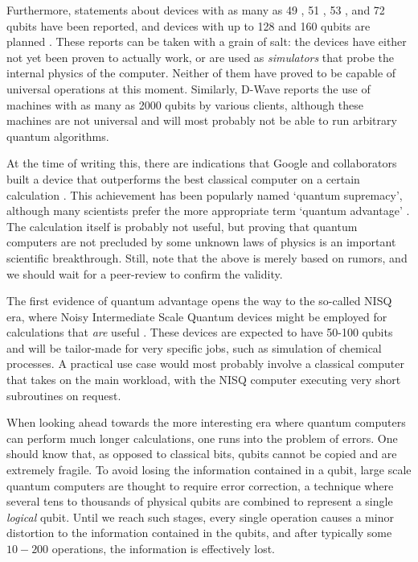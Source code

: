 Furthermore, statements about devices with as many as 49 \cite{Intel2018}, 51 \cite{Bernien2017}, 53 \cite{Zhang2017}, and 72 \cite{Bardin2019} qubits have been reported, and devices with up to 128 and 160 qubits are planned \cite{Rigetti2018,IonQ2018}. These reports can be taken with a grain of salt: the devices have either not yet been proven to actually work, or are used as \emph{simulators} that probe the internal physics of the computer. Neither of them have proved to be capable of universal operations at this moment. Similarly, D-Wave reports the use of machines with as many as 2000 qubits \cite{D-WaveSystems2018} by various clients, although these machines are not universal and will most probably not be able to run arbitrary quantum algorithms. 

At the time of writing this, there are indications that Google and collaborators built a device that outperforms the best classical computer on a certain calculation \cite{Hackett2019}. This achievement has been popularly named `quantum supremacy', although many scientists prefer the more appropriate term `quantum advantage' \cite{Wiesner2017}. The calculation itself is probably not useful, but proving that quantum computers are not precluded by some unknown laws of physics is an important scientific breakthrough. Still, note that the above is merely based on rumors, and we should wait for a peer-review to confirm the validity. 

The first evidence of quantum advantage opens the way to the so-called NISQ era, where Noisy Intermediate Scale Quantum devices might be employed for calculations that \emph{are} useful \cite{Preskill2018}. These devices are expected to have 50-100 qubits and will be tailor-made for very specific jobs, such as simulation of chemical processes. A practical use case would most probably involve a classical computer that takes on the main workload, with the NISQ computer executing very short subroutines on request. 

When looking ahead towards the more interesting era where quantum computers can perform much longer calculations, one runs into the problem of errors. One should know that, as opposed to classical bits, qubits cannot be copied and are extremely fragile. To avoid losing the information contained in a qubit, large scale quantum computers are thought to require error correction, a technique where several tens to thousands of physical qubits are combined to represent a single \emph{logical} qubit. Until we reach such stages, every single operation causes a minor distortion to the information contained in the qubits, and after typically some $10-200$ operations, the information is effectively lost. 

